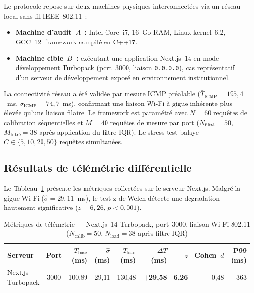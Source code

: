\documentclass[10pt,conference,compsoc]{IEEEtran}
\begin{document}
Le protocole repose sur deux machines physiques interconnectées via un
réseau local sans fil IEEE~802.11~:
\begin{itemize}
    \item \textbf{Machine d'audit~$A$~:} Intel Core~i7, 16~Go RAM,
      Linux kernel~6.2, GCC~12, framework compilé en C++17.
    \item \textbf{Machine cible~$B$~:} exécutant une application
      Next.js~14 en mode développement Turbopack (port~3000, liaison
      \texttt{0.0.0.0}), cas représentatif d'un serveur de développement
      exposé en environnement institutionnel.
\end{itemize}

La connectivité réseau a été validée par mesure ICMP préalable
($\bar{T}_{\mathrm{ICMP}} = 195{,}4$~ms, $\sigma_{\mathrm{ICMP}} =
74{,}7$~ms), confirmant une liaison Wi-Fi à gigue inhérente plus élevée
qu'une liaison filaire. Le framework est paramétré avec $N = 60$
requêtes de calibration séquentielles et $M = 40$ requêtes de mesure
par port ($N_{\mathrm{filtré}} = 50$, $M_{\mathrm{filtré}} = 38$ après
application du filtre IQR). Le stress test balaye
$C \in \{5, 10, 20, 50\}$ requêtes simultanées.

\subsection{Résultats de télémétrie différentielle}

Le Tableau~\ref{tab:telemetrie} présente les métriques collectées sur
le serveur Next.js. Malgré la gigue Wi-Fi ($\hat{\sigma} =
29{,}11$~ms), le test z de Welch détecte une dégradation hautement
significative ($z = 6{,}26$, $p < 0{,}001$).

\begin{table}[htbp]
\centering
\caption{Métriques de télémétrie — Next.js~14 Turbopack, port~3000,
liaison Wi-Fi 802.11 ($N_\mathrm{calib}=50$, $N_\mathrm{load}=38$
après filtre IQR)}
\label{tab:telemetrie}
\begin{tabular}{lcrrrrrrr}
\toprule
\textbf{Serveur} & \textbf{Port} &
$\bar{T}_\mathrm{base}$ (ms) & $\hat{\sigma}$ (ms) &
$\bar{T}_\mathrm{load}$ (ms) & $\Delta T$ (ms) &
$z$ & Cohen~$d$ & P99 (ms) \\
\midrule
Next.js Turbopack & 3000 &
100{,}89 & 29{,}11 & 130{,}48 &
\textbf{+29{,}58} & \textbf{6{,}26} & 0{,}48 & 363 \\
\bottomrule
\end{tabular}
\end{table}
\end{document}
